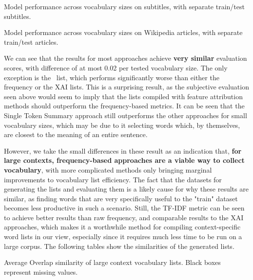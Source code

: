 \begin{table}[H]
	\centering
	\resizebox{\textwidth}{!}{%
		
	}
	\caption{Model performance across vocabulary sizes on subtitles, with separate train/test subtitles.}
	\label{tbl:performance-results-opensubs-large}
\end{table}


\begin{table}[H]
	\centering
	\resizebox{\textwidth}{!}{%
		
	}
	\caption{Model performance across vocabulary sizes on Wikipedia articles, with separate train/test articles.}
	\label{tbl:performance-results-wikipedia-large}
\end{table}

We can see that the results for most approaches achieve \textbf{very similar} evaluation scores, with difference of at most 0.02 per tested vocabulary size.
The only exception is the \Rosetta\ list, which performs significantly worse than either the frequency or the XAI lists.
This is a surprising result, as the subjective evaluation seen above would seem to imply that the lists compiled with feature attribution methods should outperform the frequency-based metrics.
It can be seen that the Single Token Summary approach still outperforms the other approaches for small vocabulary sizes, which may be due to it selecting words which, by themselves, are closest to the meaning of an entire sentence.

However, we take the small differences in these result as an indication that, \textbf{for large contexts, frequency-based approaches are a viable way to collect vocabulary}, with more complicated methods only bringing marginal improvements to vocabulary list efficiency.
The fact that the datasets for generating the lists and evaluating them is a likely cause for why these results are similar, as finding words that are very specifically useful to the "train" dataset becomes less productive in such a scenario.
Still, the TF-IDF metric can be seen to achieve better results than raw frequency, and comparable results to the XAI approaches, which makes it a worthwhile method for compiling context-specific word lists in our view, especially since it requires much less time to be run on a large corpus.
The following tables show the similarities of the generated lists.


\begin{table}[H]
	\centering
	\resizebox{\textwidth}{!}{%
		
	}
	\caption{Average Overlap similarity of large context vocabulary lists. Black boxes represent missing values.}
	\label{tbl:similarity-results-big-average-overlap}
\end{table}

